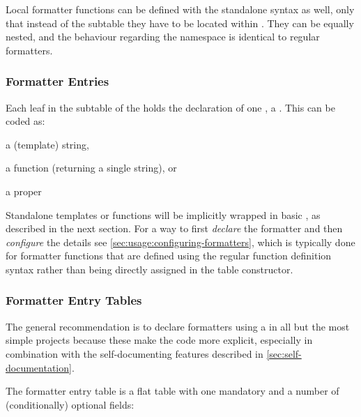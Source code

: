 \documentclass[12pt]{scrartcl}
\begin{document}
Local formatter functions can be defined with the standalone syntax as well,
only that instead of the  subtable they have to be located
within .  They can be equally nested, and the behaviour regarding
the namespace is identical to regular formatters.


\subsubsection{Formatter Entries}
\label{sec:usage:formatter-entries}

Each leaf in the  subtable of the 
holds the declaration of one , a .  This
can be coded as:

\begin{itemize*}
\item a (template) string,
\item a function (returning a single string), or
\item a proper 
\end{itemize*}

Standalone templates or functions will be implicitly wrapped in basic
, as described in the next
section. For a way to first \emph{declare} the formatter and then
\emph{configure} the details see \vref{sec:usage:configuring-formatters}, which
is typically done for formatter functions that are defined using the regular
function definition syntax rather than being directly assigned in the table
constructor.


\subsubsection{Formatter Entry Tables}
\label{sec:usage-formatter-entry-tables}

The general recommendation is to declare formatters using a  in all but the most simple projects because these make the code
more explicit, especially in combination with the self-documenting features
described in \vref{sec:self-documentation}.

The formatter entry table is a flat table with one mandatory and a number of
(conditionally) optional fields:

\paragraph{}
\end{document}
